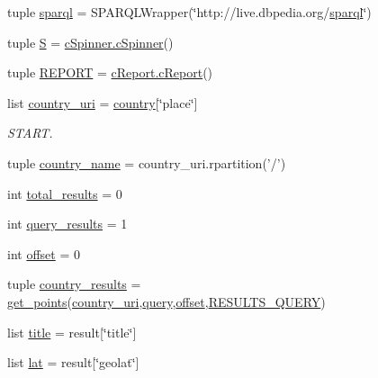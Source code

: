 \begin{DoxyCompactItemize}
\item 
tuple \hyperlink{namespacevagueplaces_a327d24ca861ef2c176f7c29da06d2da8}{sparql} = \-S\-P\-A\-R\-Q\-L\-Wrapper(\char`\"{}http\-://live.\-dbpedia.\-org/\hyperlink{namespacevagueplaces_a327d24ca861ef2c176f7c29da06d2da8}{sparql}\char`\"{})
\item 
tuple \hyperlink{namespacevagueplaces_a62d09a13c6d9f03428f5a6992dd10644}{\-S} = \hyperlink{classcSpinner_1_1cSpinner}{c\-Spinner.\-c\-Spinner}()
\item 
tuple \hyperlink{namespacevagueplaces_a480d6041ef085842ab19117d6c95fc9c}{\-R\-E\-P\-O\-R\-T} = \hyperlink{classcReport_1_1cReport}{c\-Report.\-c\-Report}()
\item 
list \hyperlink{namespacevagueplaces_aed19f140324bfa70b0d22d5078ed1a33}{country\-\_\-uri} = \hyperlink{namespacevagueplaces_a0bc0e84c0011cb9531184b67d05dc0a4}{country}\mbox{[}\char`\"{}place\char`\"{}\mbox{]}
\begin{DoxyCompactList}\small\item\em \-S\-T\-A\-R\-T. \end{DoxyCompactList}\item 
tuple \hyperlink{namespacevagueplaces_a439323fd94d6776127c4d46f50242309}{country\-\_\-name} = country\-\_\-uri.\-rpartition('/')
\item 
int \hyperlink{namespacevagueplaces_aa2411570d3d42e5c2daf01af8c980b20}{total\-\_\-results} = 0
\item 
int \hyperlink{namespacevagueplaces_a22c8a6a4861b99a18d096217c04a39af}{query\-\_\-results} = 1
\item 
int \hyperlink{namespacevagueplaces_aedee1b25605e448202ade844e392b896}{offset} = 0
\item 
tuple \hyperlink{namespacevagueplaces_a05416e0b132e478c479ed1fba77ad4a8}{country\-\_\-results} = \hyperlink{namespacevagueplaces_aed235c5c580e7ab436215ad07be55b27}{get\-\_\-points}(\hyperlink{namespacevagueplaces_aed19f140324bfa70b0d22d5078ed1a33}{country\-\_\-uri},\hyperlink{namespacevagueplaces_afc402b26135ad61137fcb1208053cbf8}{query},\hyperlink{namespacevagueplaces_aedee1b25605e448202ade844e392b896}{offset},\hyperlink{namespacevagueplaces_a07cd0ae682261d720780294aba9e03f4}{\-R\-E\-S\-U\-L\-T\-S\-\_\-\-Q\-U\-E\-R\-Y})
\item 
list \hyperlink{namespacevagueplaces_a967dc293801b4684884a9841274c9591}{title} = result\mbox{[}\char`\"{}title\char`\"{}\mbox{]}
\item 
list \hyperlink{namespacevagueplaces_affe00f0ec5293de098491e2ee7a27bbf}{lat} = result\mbox{[}\char`\"{}geolat\char`\"{}\mbox{]}

\end{DoxyCompactItemize}
